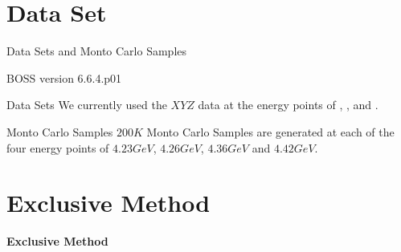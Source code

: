 \documentclass{beamer}
\begin{document}
\section{Data Set}
\begin{frame}{Data Sets and Monto Carlo Samples}
    \begin{block}{BOSS version}
        6.6.4.p01
    \end{block}
    \begin{block}{Data Sets}
        We currently used the $XYZ$ data at the energy points of \color{red}{$4.23 GeV$}, \color{red}{$4.26 GeV$}, \color{red}{$4.36 GeV$} and \color{red}{$4.42 GeV$}.
    \end{block}
    \begin{block}{Monto Carlo Samples}
        $200 K$ Monto Carlo Samples are generated at each of the four energy points of $4.23 GeV$, $4.26 GeV$, $4.36 GeV$ and $4.42 GeV$.
    \end{block}
\end{frame}
\section{Exclusive Method}
\begin{frame}
    \begin{center}
        \Huge{\bf Exclusive Method}
    \end{center}
\end{frame}
\end{document}
